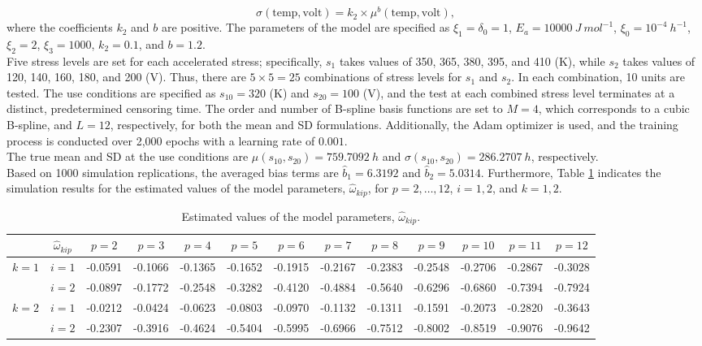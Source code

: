 \documentclass[twoside]{article}
\begin{document}
\begin{equation}
\sigma(\text{temp},\text{volt})=k_{2}\times\mu^{b}(\text{temp},\text{volt}),           
  \label{eq4.3}
\end{equation}
where the coefficients $k_{2}$ and $b$ are positive. The parameters of the model are specified as $\xi_{1}=\delta_{0}=1$, $E_{a}=10000\:J \:mol^{-1}$, $\xi_{ 0 } =10 ^ {-4}\:h^{-1}$, $\xi_{2}=2$, $\xi_{3}=1000$, $k_{2}=0.1$, and $b = 1.2$.\\
Five stress levels are set for each accelerated stress; specifically, $s_{1}$ takes values of 350, 365, 380, 395, and 410 (K), while $s_{2}$ takes values of 120, 140, 160, 180, and 200 (V). Thus, there are $5 \times 5 =25$ combinations of stress levels for $s_{1}$ and $s_{2}$. In each combination,
10 units are tested. The use conditions are specified as $s_{10}=320$ (K) and $s_{20}=100$ (V), and the test at each combined stress level terminates at a distinct, predetermined censoring time. The order and number of B-spline basis functions are set to $M = 4$, which corresponds to a cubic B-spline, and $L=12$, respectively, for both the mean and SD formulations. Additionally, the Adam optimizer is used, and the training process is conducted over 2,000 epochs with a learning rate of \( 0.001 \).\\
The true mean and SD at the use conditions are $\mu(s_{10},s_{20})=759.7092 \: h$ and $\sigma(s_{10},s_{20})=286.2707 \: h$, respectively. \\
Based on 1000 simulation replications, the averaged bias terms are $\hat{b}_{1} = 6.3192$ and $\hat{b}_{2} = 5.0314$. Furthermore, Table \ref{tab1} indicates the simulation results for the estimated values of the model parameters, $\hat{\omega}_{kip}$, for $p=2,\ldots, 12$, $i=1,2$, and $k=1,2$.
\begin{table}[h]
\begin{center}
\small
\caption{Estimated values of the model parameters, $\hat{\omega}_{kip}$.}\label{tab1}%
\begin{tabular}{| c | c | c | c | c | c | c | c | c | c | c | c | c |}
\hline
& $\hat{\omega}_{kip}$ & $p=2$ & $p=3$ & $p=4$ & $p=5$ & $p=6$ & $p=7$ & $p=8$ & $p=9$ & $p=10$ & $p=11$ & $p=12$ \\ \hline \hline
$k=1$ & $i=1$ & -0.0591 & -0.1066 & -0.1365 & -0.1652 & -0.1915 & -0.2167 & -0.2383 & -0.2548 & -0.2706 & -0.2867 & -0.3028  \\
 &  $i=2$ & -0.0897 & -0.1772 & -0.2548 & -0.3282 & -0.4120 & -0.4884 & -0.5640 & -0.6296 & -0.6860 & -0.7394 & -0.7924 \\
$k=2$ & $i=1$ & -0.0212 & -0.0424 & -0.0623 & -0.0803 & -0.0970 & -0.1132 & -0.1311 & -0.1591 & -0.2073 & -0.2820 & -0.3643\\
 &  $i=2$ & -0.2307 & -0.3916 & -0.4624 & -0.5404 & -0.5995 & -0.6966 & -0.7512 & -0.8002 & -0.8519 & -0.9076 & -0.9642 \\ 
\hline
\end{tabular}
\end{center}
\end{table} 
\end{document}
